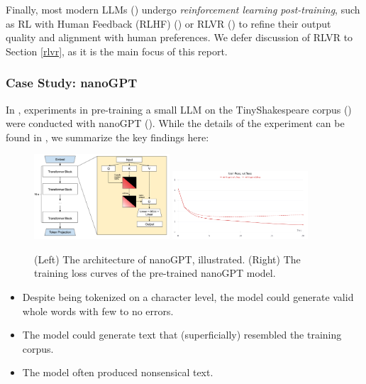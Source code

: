 \documentclass{article} %
\theoremstyle{definition}
\begin{document}
Finally, most modern LLMs (\cite{tulu3, r1}) undergo \textit{reinforcement learning post-training},
such as RL with Human Feedback (RLHF) (\cite{Christiano-et-al-2017, InstructGPT-2022})
or RLVR (\cite{tulu3, grpo, r1}) to refine their output quality and alignment with human preferences.
We defer discussion of RLVR to Section \ref{rlvr}, as it is the main focus of this report.

\subsubsection{Case Study: nanoGPT}
In \cite{wk8}, experiments in pre-training a small LLM on the TinyShakespeare corpus (\cite{tinyss, tinyss2}) were
conducted with nanoGPT (\cite{nanoGPT}). While the details of the experiment can be found in \cite{wk8},
we summarize the key findings here:
\begin{figure}
    \centering
    \includegraphics[width=0.45\textwidth, height=0.15\textheight]{images/gpt_arch.png}
    \includegraphics[width=0.45\textwidth, height=0.15\textheight]{images/loss_curves.png}
    \caption{(Left) The architecture of nanoGPT, illustrated. (Right) The training loss curves of the pre-trained nanoGPT model.}
    \label{fig:nanoGPT-sample}
\end{figure}
\begin{itemize}
    \item Despite being tokenized on a character level, the model could generate valid whole words
         with few to no errors.
    \item The model could generate text that (superficially) resembled the training corpus.
    \item The model often produced nonsensical text.
\end{itemize}
\end{document}

